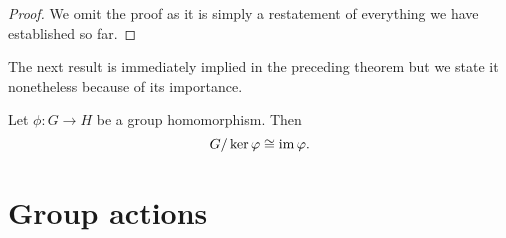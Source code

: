 \begin{proof}
    We omit the proof as it is simply a restatement of everything we have established so far.
\end{proof}

The next result is immediately implied in the preceding theorem but we state it nonetheless because of its importance.

\begin{theorem}
    Let \(\phi: G \to H\) be a group homomorphism. Then
    \[
        G/\ker \varphi \cong \operatorname{im} \varphi.
    \]
\end{theorem}

\section{Group actions}

\begin{definition}
    
\end{definition}